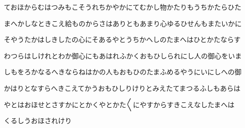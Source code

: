 \documentclass[a4paper,11pt,landscape]{ltjtarticle}
\begin{document}
\par\medskip
ておほからむはつみもこそうれちかやかにてむかし物かたりもうちかたらひた
\par\medskip
まへかしなときこえ給ものからさはありともあまり心ゆるひせんもまたいかに
\par\medskip
そやうたかはしきしたの心にそあるやとうちかへしのたまへはひとかたならす
\par\medskip
わつらはしけれとわか御心にもあはれふかくおもひしられにし人の御心をいま
\par\medskip
しもをろかなるへきならねはかの人もおもひのたまふめるやうにいにしへの御
\par\medskip
かはりとなすらへきこえてかうおもひしりけりとみえたてまつるふしもあらは
\par\medskip
やとはおほせとさすかにとかくやとかた〱にやすからすきこえなしたまへは
\par\medskip
くるしうおほされけり
\par\medskip
\end{document}

